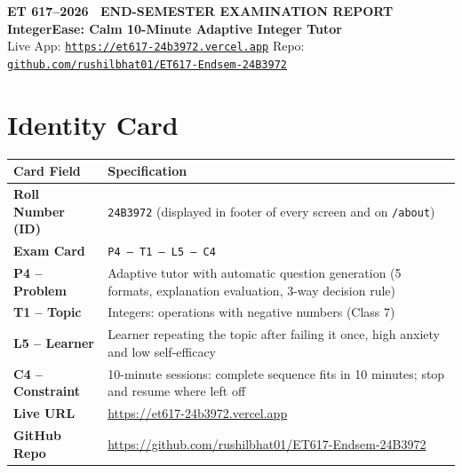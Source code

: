\documentclass[10pt,a4paper]{article}
\begin{document}
\begin{tcolorbox}[
  enhanced,
  colback=SkyPrimary,
  colframe=SkyPrimary,
  arc=6pt,
  boxrule=0pt,
  left=14pt, right=14pt, top=12pt, bottom=12pt
]
  {\footnotesize\bfseries\color{SkyBorder} ET 617--2026 \textbullet\ END-SEMESTER EXAMINATION REPORT}\\[4pt]
  {\LARGE\bfseries\color{white} IntegerEase: Calm 10-Minute Adaptive Integer Tutor}\\[5pt]
  {\small\color{SkyLight} Live App: \href{https://et617-24b3972.vercel.app}{\texttt{https://et617-24b3972.vercel.app}} \quad\textbullet\quad Repo: \href{https://github.com/rushilbhat01/ET617-Endsem-24B3972}{\texttt{github.com/rushilbhat01/ET617-Endsem-24B3972}}}
\end{tcolorbox}

\section*{Identity Card}
\begin{tabularx}{\linewidth}{@{}l X@{}}
\toprule
\textbf{Card Field} & \textbf{Specification} \\
\midrule
\textbf{Roll Number (ID)} & \texttt{24B3972} (displayed in footer of every screen and on \texttt{/about}) \\
\textbf{Exam Card} & \texttt{P4 -- T1 -- L5 -- C4} \\
\textbf{P4 -- Problem} & Adaptive tutor with automatic question generation (5 formats, explanation evaluation, 3-way decision rule) \\
\textbf{T1 -- Topic} & Integers: operations with negative numbers (Class 7) \\
\textbf{L5 -- Learner} & Learner repeating the topic after failing it once, high anxiety and low self-efficacy \\
\textbf{C4 -- Constraint} & 10-minute sessions: complete sequence fits in 10 minutes; stop and resume where left off \\
\textbf{Live URL} & \url{https://et617-24b3972.vercel.app} \\
\textbf{GitHub Repo} & \url{https://github.com/rushilbhat01/ET617-Endsem-24B3972} \\
\bottomrule
\end{tabularx}
\end{document}
